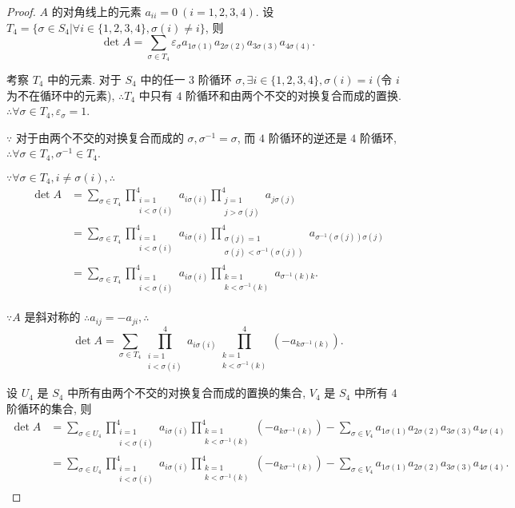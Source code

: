 \documentclass{ctexart}
\begin{document}
\begin{proof}
    $A$ 的对角线上的元素 $a_{ii}=0\ (i=1,2,3,4)$. 设 $T_4=\{\sigma\in S_4|\forall i\in\{1,2,3,4\},\sigma(i)\neq i\}$, 则
    \[\det A=\sum\limits_{\sigma\in T_4}\varepsilon_\sigma a_{1\sigma(1)}a_{2\sigma(2)}a_{3\sigma(3)}a_{4\sigma(4)}.\]

    考察 $T_4$ 中的元素. 对于 $S_4$ 中的任一 $3$ 阶循环 $\sigma,\exists i\in\{1,2,3,4\},\sigma(i)=i$ (令 $i$ 为不在循环中的元素), $\therefore T_4$ 中只有 $4$ 阶循环和由两个不交的对换复合而成的置换. $\therefore\forall\sigma\in T_4,\varepsilon_\sigma=1$.

    $\because$ 对于由两个不交的对换复合而成的 $\sigma,\sigma^{-1}=\sigma$, 而 $4$ 阶循环的逆还是 $4$ 阶循环, $\therefore\forall\sigma\in T_4,\sigma^{-1}\in T_4$.

    $\because\forall\sigma\in T_4,i\neq\sigma(i),\therefore$
    \begin{align*}
        \det A & =\sum\limits_{\sigma\in T_4}\prod\limits_{\substack{i=1\\i<\sigma(i)}}^4a_{i\sigma(i)}\prod\limits_{\substack{j=1\\j>\sigma(j)}}^4a_{j\sigma(j)} \\
        & =\sum\limits_{\sigma\in T_4}\prod\limits_{\substack{i=1\\i<\sigma(i)}}^4a_{i\sigma(i)}\prod\limits_{\substack{\sigma(j)=1\\\sigma(j)<\sigma^{-1}(\sigma(j))}}^4a_{\sigma^{-1}(\sigma(j))\sigma(j)} \\
        & =\sum\limits_{\sigma\in T_4}\prod\limits_{\substack{i=1\\i<\sigma(i)}}^4a_{i\sigma(i)}\prod\limits_{\substack{k=1\\k<\sigma^{-1}(k)}}^4a_{\sigma^{-1}(k)k}.
    \end{align*}

    $\because A$ 是斜对称的 $\therefore a_{ij}=-a_{ji},\therefore$
    \[\det A=\sum\limits_{\sigma\in T_4}\prod\limits_{\substack{i=1\\i<\sigma(i)}}^4a_{i\sigma(i)}\prod\limits_{\substack{k=1\\k<\sigma^{-1}(k)}}^4(-a_{k\sigma^{-1}(k)}).\]

    设 $U_4$ 是 $S_4$ 中所有由两个不交的对换复合而成的置换的集合, $V_4$ 是 $S_4$ 中所有 $4$ 阶循环的集合, 则
    \begin{align*}
        \det A & =\sum\limits_{\sigma\in U_4}\prod\limits_{\substack{i=1\\i<\sigma(i)}}^4a_{i\sigma(i)}\prod\limits_{\substack{k=1\\k<\sigma^{-1}(k)}}^4(-a_{k\sigma^{-1}(k)})-\sum\limits_{\sigma\in V_4}a_{1\sigma(1)}a_{2\sigma(2)}a_{3\sigma(3)}a_{4\sigma(4)} \\
        & =\sum\limits_{\sigma\in U_4}\prod\limits_{\substack{i=1\\i<\sigma(i)}}^4a_{i\sigma(i)}\prod\limits_{\substack{k=1\\k<\sigma^{-1}(k)}}^4(-a_{k\sigma^{-1}(k)})-\sum\limits_{\sigma\in V_4}a_{1\sigma(1)}a_{2\sigma(2)}a_{3\sigma(3)}a_{4\sigma(4)}.
    \end{align*}


\end{proof}
\end{document}
